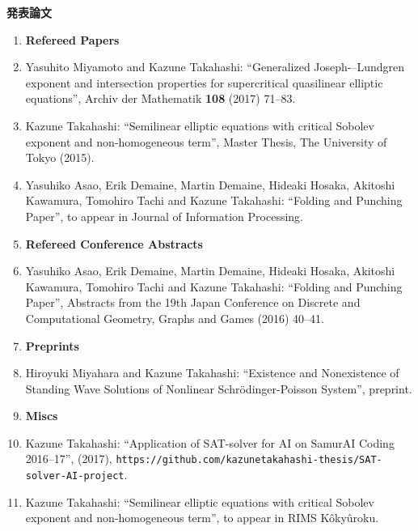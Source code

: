 \vspace{0.2cm}
\noindent
{\bf 発表論文}

\vspace{0.1cm}

\begin{enumerate}
 \item[] {\bf Refereed Papers}
 \item Yasuhito Miyamoto and Kazune Takahashi: ``Generalized
       Joseph-–Lundgren exponent and intersection properties for
       supercritical quasilinear elliptic equations'',
       Archiv der Mathematik {\bf 108} (2017) 71--83. 
 \item Kazune Takahashi: ``Semilinear elliptic equations with critical
       Sobolev exponent and non-homogeneous term'',
       Master Thesis, The University of Tokyo (2015).
 \item Yasuhiko Asao, Erik Demaine, Martin Demaine, Hideaki Hosaka,
       Akitoshi Kawamura, Tomohiro Tachi and Kazune Takahashi:
       ``Folding and Punching Paper'', to appear in
       Journal of Information Processing.
 \item[] {\bf Refereed Conference Abstracts}
 \item Yasuhiko Asao, Erik Demaine, Martin Demaine, Hideaki Hosaka,
       Akitoshi Kawamura, Tomohiro Tachi and Kazune Takahashi:
       ``Folding and Punching Paper'', Abstracts from the 19th Japan
       Conference on Discrete and Computational Geometry, Graphs and
       Games (2016) 40--41.
 \item[] {\bf Preprints}
 \item Hiroyuki Miyahara and Kazune Takahashi: ``Existence and
       Nonexistence of Standing Wave Solutions of 
       Nonlinear Schr\"{o}dinger-Poisson System'', preprint.
 \item[] {\bf Miscs}
 \item Kazune Takahashi: ``Application of SAT-solver for AI on SamurAI
       Coding 2016--17'', (2017),
       {\tt https:\slash\slash{}github.com\slash{}kazunetakahashi-thesis\slash{}SAT-solver-AI-project}.
 \item Kazune Takahashi: ``Semilinear elliptic equations with
       critical Sobolev exponent and non-homogeneous term'',
       to appear in RIMS K\^{o}ky\^{u}roku.
\end{enumerate}

